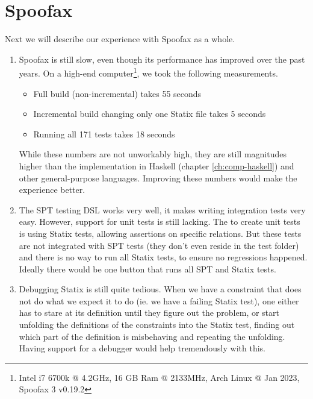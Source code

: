 \section{Spoofax}

Next we will describe our experience with Spoofax as a whole. 

\begin{enumerate}
	\item Spoofax is still slow, even though its performance has improved over the past years. On a high-end computer\footnote{Intel i7 6700k @ 4.2GHz, 16 GB Ram @ 2133MHz, Arch Linux @ Jan 2023, Spoofax 3 v0.19.2}, we took the following measurements.
	\begin{itemize}
		\item Full build (non-incremental) takes 55 seconds
		\item Incremental build changing only one Statix file takes 5 seconds
		\item Running all 171 tests takes 18 seconds
	\end{itemize}
	While these numbers are not unworkably high, they are still magnitudes higher than the implementation in Haskell (chapter \ref{ch:comp-haskell}) and other general-purpose languages. Improving these numbers would make the experience better.
	
	\item The SPT testing DSL works very well, it makes writing integration tests very easy. However, support for unit tests is still lacking. The to create unit tests is using Statix tests, allowing assertions on specific relations. But these tests are not integrated with SPT tests (they don't even reside in the test folder) and there is no way to run all Statix tests, to ensure no regressions happened. Ideally there would be one button that runs all SPT and Statix tests.
	
	\item Debugging Statix is still quite tedious. When we have a constraint that does not do what we expect it to do (ie. we have a failing Statix test), one either has to stare at its definition until they figure out the problem, or start unfolding the definitions of the constraints into the Statix test, finding out which part of the definition is misbehaving and repeating the unfolding. Having support for a debugger would help tremendously with this.
\end{enumerate}
